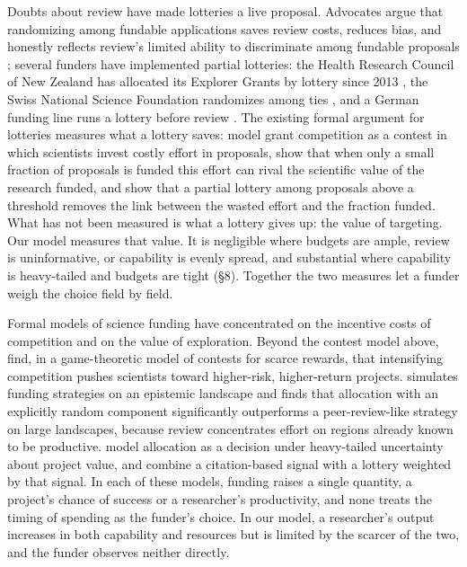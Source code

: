 \documentclass[article, 11pt, reqno]{amsart}
\theoremstyle{named}
\begin{document}
Doubts about review have made lotteries a live proposal. Advocates argue that randomizing among fundable applications saves review costs, reduces bias, and honestly reflects review's limited ability to discriminate among fundable proposals \citep{FangCasadevall2016, Avin2019, Roumbanis2019}; several funders have implemented partial lotteries: the Health Research Council of New Zealand has allocated its Explorer Grants by lottery since 2013 \citep{Liu2020}, the Swiss National Science Foundation randomizes among ties \citep{Heyard2022}, and a German funding line runs a lottery before review \citep{Luebber2025}. The existing formal argument for lotteries measures what a lottery saves: \citet{GrossBergstrom2019} model grant competition as a contest in which scientists invest costly effort in proposals, show that when only a small fraction of proposals is funded this effort can rival the scientific value of the research funded, and show that a partial lottery among proposals above a threshold removes the link between the wasted effort and the fraction funded. What has not been measured is what a lottery gives up: the value of targeting. Our model measures that value. It is negligible where budgets are ample, review is uninformative, or capability is evenly spread, and substantial where capability is heavy-tailed and budgets are tight (\S8). Together the two measures let a funder weigh the choice field by field.

Formal models of science funding have concentrated on the incentive costs of competition and on the value of exploration. Beyond the contest model above, \citet{GrossBergstrom2025} find, in a game-theoretic model of contests for scarce rewards, that intensifying competition pushes scientists toward higher-risk, higher-return projects. \citet{AvinBJPS2019} simulates funding strategies on an epistemic landscape and finds that allocation with an explicitly random component significantly outperforms a peer-review-like strategy on large landscapes, because review concentrates effort on regions already known to be productive. \citet{Sorzano2026} model allocation as a decision under heavy-tailed uncertainty about project value, and combine a citation-based signal with a lottery weighted by that signal. In each of these models, funding raises a single quantity, a project's chance of success or a researcher's productivity, and none treats the timing of spending as the funder's choice. In our model, a researcher's output increases in both capability and resources but is limited by the scarcer of the two, and the funder observes neither directly.
\end{document}
